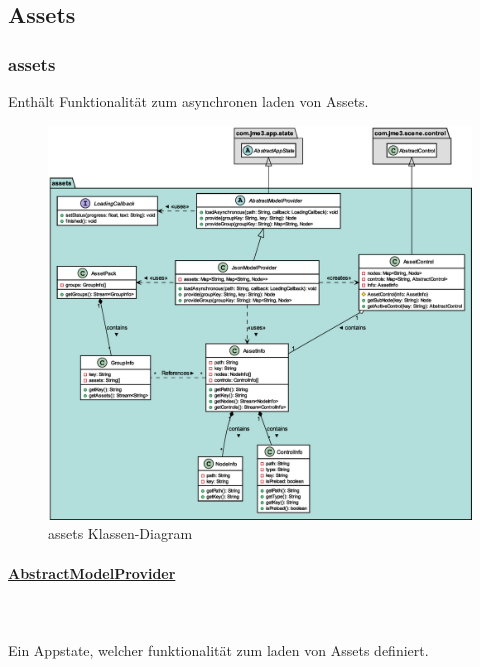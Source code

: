 \subsection{Assets}

\subsubsection{assets}

    Enthält Funktionalität zum asynchronen laden von Assets.

    \begin{figure}[htbp]
        \centering
        \includegraphics[width=\linewidth]{Assets/assets.eps}
        \caption{assets Klassen-Diagram}
    \end{figure}

    \pagebreak
    \paragraph{\underline{AbstractModelProvider}} \mbox{}\\
    \\
        Ein Appstate, welcher funktionalität zum laden von Assets definiert.\par

